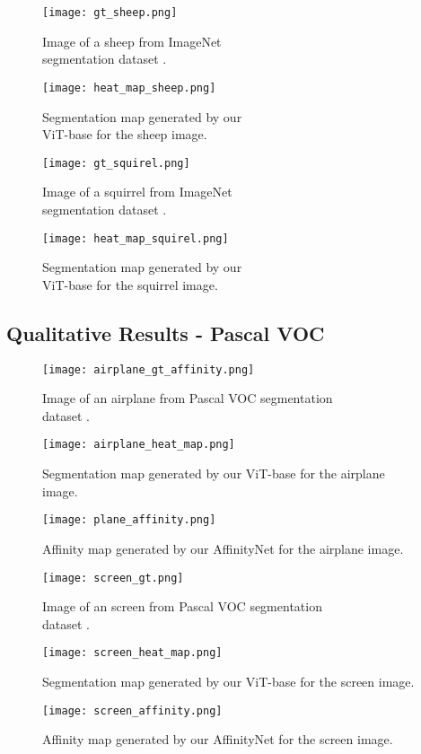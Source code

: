 \documentclass{article}
\begin{document}
\begin{figure}[H]
  \texttt{[image: gt\_sheep.png]}
  \caption{Image of a sheep from ImageNet \\segmentation dataset \cite{imagenet-seg}.}\label{fig:gt_sheep}
\endminipage\hfill
{}
  \texttt{[image: heat\_map\_sheep.png]}
  \caption{Segmentation map generated by our \\ViT-base for the sheep image.}\label{fig:map_sheep}
\endminipage\hfill
\end{figure}

\begin{figure}[H]
  \texttt{[image: gt\_squirel.png]}
  \caption{Image of a squirrel from ImageNet \\segmentation dataset \cite{imagenet-seg}.}\label{fig:gt_squirel}
\endminipage\hfill
{}
  \texttt{[image: heat\_map\_squirel.png]}
  \caption{Segmentation map generated by our \\ViT-base for the squirrel image.}\label{fig:map_squirel}
\endminipage\hfill
\end{figure}

\subsection*{Qualitative Results - Pascal VOC}
\label{Pascal_results}

\begin{figure}[H]
  \texttt{[image: airplane\_gt\_affinity.png]}
  \caption{Image of an airplane from Pascal VOC segmentation \\dataset \cite{ahn2018learning}.}
  \label{fig:plane_gt}
\endminipage\hfill
{}
  \texttt{[image: airplane\_heat\_map.png]}
  \caption{Segmentation map generated by our ViT-base for the airplane image.}
  \label{fig:phane_map}
\endminipage\hfill
{}%
  \texttt{[image: plane\_affinity.png]}
  \caption{Affinity map generated by our AffinityNet for the airplane image.}
  \label{fig:plane_aff}
\endminipage
\end{figure}

\begin{figure}[H]
  \texttt{[image: screen\_gt.png]}
  \caption{Image of an screen from Pascal VOC segmentation \\dataset \cite{ahn2018learning}.}
  \label{fig:screen_gt}
\endminipage\hfill
{}
  \texttt{[image: screen\_heat\_map.png]}
  \caption{Segmentation map generated by our ViT-base for the screen image.}
  \label{fig:screen_map}
\endminipage\hfill
{}%
  \texttt{[image: screen\_affinity.png]}
  \caption{Affinity map generated by our AffinityNet for the screen image.}
  \label{fig:screen_aff}
\endminipage
\end{figure}
\end{document}
